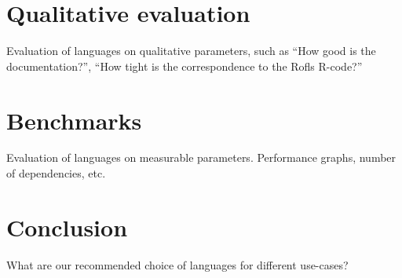 \chapter{Qualitative evaluation}
Evaluation of languages on qualitative parameters, such as ``How good
is the documentation?'', ``How tight is the correspondence to the
Rofls R-code?''

\chapter{Benchmarks}
Evaluation of languages on measurable parameters. Performance graphs,
number of dependencies, etc.

\chapter{Conclusion}
What are our recommended choice of languages for different use-cases?

